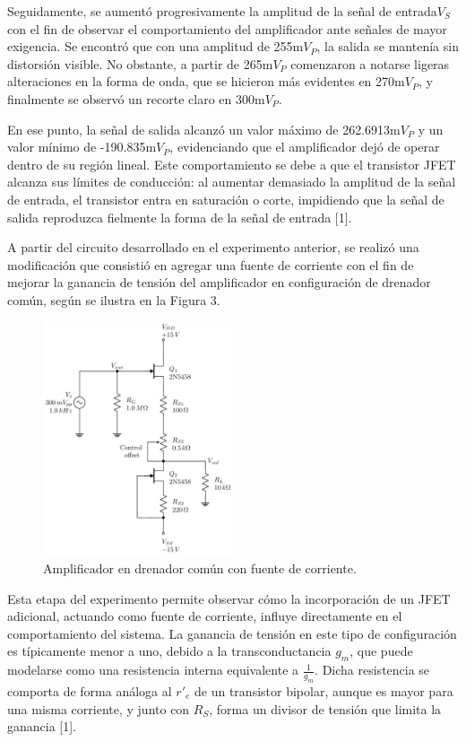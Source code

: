 \documentclass[journal]{IEEEtran}
\begin{document}
	\par Seguidamente, se aumentó progresivamente la amplitud de la señal de entrada\( V_S \) con el fin de observar el comportamiento del amplificador ante señales de mayor exigencia. Se encontró que con una amplitud de 255m\( V_P \), la salida se mantenía sin distorsión visible. No obstante, a partir de 265m\( V_P \) comenzaron a notarse ligeras alteraciones en la forma de onda, que se hicieron más evidentes en 270m\( V_P \), y finalmente se observó un recorte claro en 300m\( V_P \).
	\par En ese punto, la señal de salida alcanzó un valor máximo de 262.6913m\( V_P \) y un valor mínimo de -190.835m\( V_P \), evidenciando que el amplificador dejó de operar dentro de su región lineal. Este comportamiento se debe a que el transistor JFET alcanza sus límites de conducción: al aumentar demasiado la amplitud de la señal de entrada, el transistor entra en saturación o corte, impidiendo que la señal de salida reproduzca fielmente la forma de la señal de entrada [1].
	\par A partir del circuito desarrollado en el experimento anterior, se realizó una modificación que consistió en agregar una fuente de corriente con el fin de mejorar la ganancia de tensión del amplificador en configuración de drenador común, según se ilustra en la Figura 3.
	\begin{figure}[H]
		\centering
		\includegraphics[width=0.5\textwidth]{Media/amplificador_fuente_corriente.png}
		\caption{Amplificador en drenador común con fuente de corriente.}
		\label{fig:amplificador_fuente_corriente.}
	\end{figure}
	\par Esta etapa del experimento permite observar cómo la incorporación de un JFET adicional, actuando como fuente de corriente, influye directamente en el comportamiento del sistema. La ganancia de tensión en este tipo de configuración es típicamente menor a uno, debido a la transconductancia $g_m$, que puede modelarse como una resistencia interna equivalente a $\frac{1}{g_m}$. Dicha resistencia se comporta de forma análoga al $r'_e$ de un transistor bipolar, aunque es mayor para una misma corriente, y junto con $R_S$, forma un divisor de tensión que limita la ganancia [1].
\end{document}

